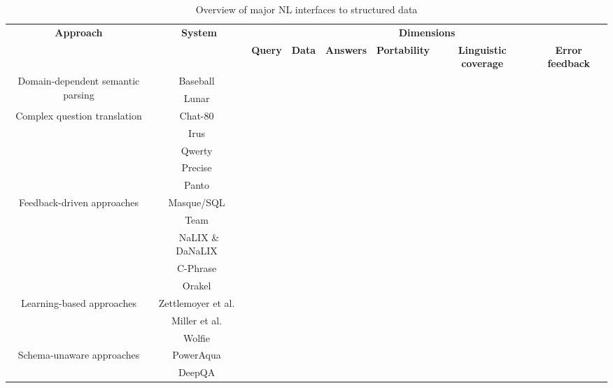 \documentclass[10pt,journal,letterpaper,compsoc]{IEEEtran}
\begin{document}
\begin{table}
\centering
\begin{tabular}{|c|c|c|c|c|c|c|c|}\hline
\multirow{2}{*}{\bf Approach} & \multirow{2}{*}{\bf System} &
\multicolumn{6}{c|}{\bf Dimensions}\\\cline{3-8}
& & {\bf Query} & {\bf Data} & {\bf Answers} & {\bf Portability} & {\bf
Linguistic coverage} & {\bf Error feedback}\\\hline\hline 
\multirow{2}{*}{Domain-dependent semantic parsing} & {\sc
Baseball}~\cite{Green:1961:BAQ:1460690.1460714} & & & & & & \\\cline{2-8}
& {\sc Lunar}~\cite{Woods:1973:PNL:1499586.1499695} & & & & & & \\\hline
\multirow{5}{*}{Complex question translation} & {\sc
Chat-80}~\cite{Warren:1982:EEA:972942.972944} & & & & & & \\\cline{2-8}
& {\sc Irus}~\cite{Bates:1983:IRU:511793.511804} & & & & & & \\\cline{2-8}
& {\sc Qwerty}~\cite{Nelken:2000:QTD:992730.992808} & & & & & & \\\cline{2-8}
& {\sc
Precise}~\cite{Popescu:2004:MNL:1220355.1220376,Popescu:2003:TTN:604045.604070}
& & & & & & \\\cline{2-8}
& {\sc Panto}~\cite{Wang:2007:PPN:1419662.1419706} & & & & & & \\\hline
\multirow{5}{*}{Feedback-driven approaches} &
{\sc Masque/SQL}~\cite{Androutsopoulos93masque} & & & & & & \\\cline{2-8}
& {\sc Team}~\cite{Grosz:1987:TED:25672.25674} & & & & & & \\\cline{2-8}
& {\sc NaLIX} \& {\sc DaNaLIX}~\cite{Li:2005:NIN:1066157.1066281} & & & & & &
\\\cline{2-8}
& {\sc C-Phrase}~\cite{Minock:2010:CSB:1715942.1716190} & & & & & &
\\\cline{2-8}
& {\sc
Orakel}~\cite{Cimiano:2007:PNL:1216295.1216330} & & & & & & \\\hline
\multirow{3}{*}{Learning-based approaches} & Zettlemoyer
et al.~\cite{DBLP:conf/uai/ZettlemoyerC05} & & & & & & \\\cline{2-8}
& Miller et al.~\cite{Miller:1996:FSA:981863.981871} & & & & & & \\\cline{2-8}
& {\sc Wolfie}~\cite{Thompson:2003:AWM:1622420.1622421} & & & & & &
\\\hline
\multirow{2}{*}{Schema-unaware approaches} & {\sc
PowerAqua}~\cite{DBLP:conf/esws/LopezMU06} & & & & & & \\\cline{2-8}
 & {\sc DeepQA}~\cite{DBLP:journals/aim/FerrucciBCFGKLMNPSW10} & & & & & &
 \\\hline
\end{tabular}
\caption{Overview of major NL interfaces to structured data}
\label{tab:overview}
\end{table}
\end{document}
